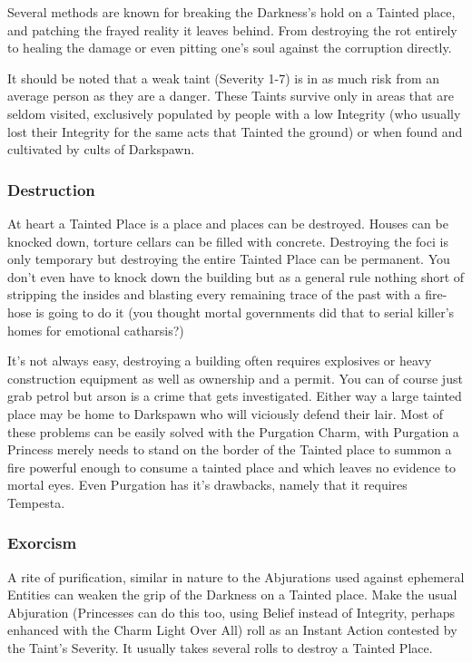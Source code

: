 Several methods are known for breaking the Darkness's hold on a Tainted place, and patching the frayed reality it leaves behind. From destroying the rot entirely to healing the damage or even pitting one's soul against the corruption directly. 

It should be noted that a weak taint (Severity 1-7) is in as much risk from an average person as they are a danger. These Taints survive only in areas that are seldom visited, exclusively populated by people with a low Integrity (who usually lost their Integrity for the same acts that Tainted the ground) or when found and cultivated by cults of Darkspawn.

\subsubsection*{Destruction}

At heart a Tainted Place is a place and places can be destroyed. Houses can be knocked down, torture cellars can be filled with concrete. Destroying the foci is only temporary but destroying the entire Tainted Place can be permanent. You don't even have to knock down the building but as a general rule nothing short of stripping the insides and blasting every remaining trace of the past with a fire-hose is going to do it (you thought mortal governments did that to serial killer's homes for emotional catharsis?)

It's not always easy, destroying a building often requires explosives or heavy construction equipment as well as ownership and a permit. You can of course just grab petrol but arson is a crime that gets investigated. Either way a large tainted place may be home to Darkspawn who will viciously defend their lair. Most of these problems can be easily solved with the Purgation Charm, with Purgation a Princess merely needs to stand on the border of the Tainted place to summon a fire powerful enough to consume a tainted place and which leaves no evidence to mortal eyes. Even Purgation has it's drawbacks, namely that it requires Tempesta. 

\subsubsection*{Exorcism}

A rite of purification, similar in nature to the Abjurations used against ephemeral Entities can weaken the grip of the Darkness on a Tainted place. Make the usual Abjuration (Princesses can do this too, using Belief instead of Integrity, perhaps enhanced with the Charm Light Over All) roll as an Instant Action contested by the Taint's Severity. It usually takes several rolls to destroy a Tainted Place. 

